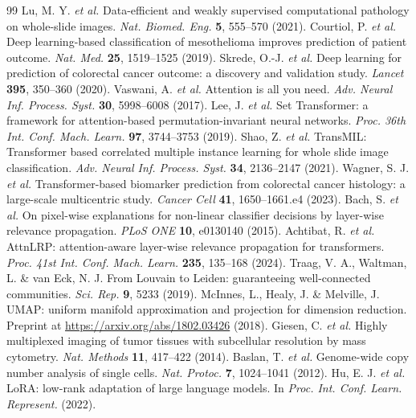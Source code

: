 \documentclass[11pt]{article}
\begin{document}
\begin{thebibliography}{99}
 Lu, M. Y. \textit{et al.} Data-efficient and weakly supervised computational pathology on whole-slide images. \textit{Nat. Biomed. Eng.} \textbf{5}, 555--570 (2021).
 Courtiol, P. \textit{et al.} Deep learning-based classification of mesothelioma improves prediction of patient outcome. \textit{Nat. Med.} \textbf{25}, 1519--1525 (2019).
 Skrede, O.-J. \textit{et al.} Deep learning for prediction of colorectal cancer outcome: a discovery and validation study. \textit{Lancet} \textbf{395}, 350--360 (2020).
 Vaswani, A. \textit{et al.} Attention is all you need. \textit{Adv. Neural Inf. Process. Syst.} \textbf{30}, 5998--6008 (2017).
 Lee, J. \textit{et al.} Set Transformer: a framework for attention-based permutation-invariant neural networks. \textit{Proc. 36th Int. Conf. Mach. Learn.} \textbf{97}, 3744--3753 (2019).
 Shao, Z. \textit{et al.} TransMIL: Transformer based correlated multiple instance learning for whole slide image classification. \textit{Adv. Neural Inf. Process. Syst.} \textbf{34}, 2136--2147 (2021).
 Wagner, S. J. \textit{et al.} Transformer-based biomarker prediction from colorectal cancer histology: a large-scale multicentric study. \textit{Cancer Cell} \textbf{41}, 1650--1661.e4 (2023).
 Bach, S. \textit{et al.} On pixel-wise explanations for non-linear classifier decisions by layer-wise relevance propagation. \textit{PLoS ONE} \textbf{10}, e0130140 (2015).
 Achtibat, R. \textit{et al.} AttnLRP: attention-aware layer-wise relevance propagation for transformers. \textit{Proc. 41st Int. Conf. Mach. Learn.} \textbf{235}, 135--168 (2024).
 Traag, V. A., Waltman, L. \& van Eck, N. J. From Louvain to Leiden: guaranteeing well-connected communities. \textit{Sci. Rep.} \textbf{9}, 5233 (2019).
 McInnes, L., Healy, J. \& Melville, J. UMAP: uniform manifold approximation and projection for dimension reduction. Preprint at \url{https://arxiv.org/abs/1802.03426} (2018).
 Giesen, C. \textit{et al.} Highly multiplexed imaging of tumor tissues with subcellular resolution by mass cytometry. \textit{Nat. Methods} \textbf{11}, 417--422 (2014).
 Baslan, T. \textit{et al.} Genome-wide copy number analysis of single cells. \textit{Nat. Protoc.} \textbf{7}, 1024--1041 (2012).
 Hu, E. J. \textit{et al.} LoRA: low-rank adaptation of large language models. In \textit{Proc. Int. Conf. Learn. Represent.} (2022).

\end{thebibliography}
\end{document}
